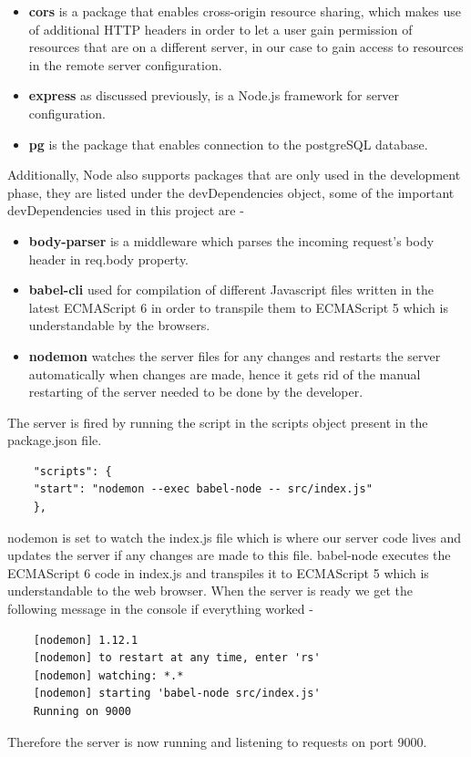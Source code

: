 \documentclass[../thesis.tex]{subfiles}
\begin{document}
	\begin{itemize}
		\item \textbf{cors} is a package that enables cross-origin resource sharing, which makes use of additional HTTP headers in order to let a user gain permission of resources that are on a different server, in our case to gain access to resources in the remote server configuration.

		\item \textbf{express} as discussed previously, is a Node.js framework for server configuration.

		\item \textbf{pg} is the package that enables connection to the postgreSQL database.
	\end{itemize}

	Additionally, Node also supports packages that are only used in the development phase, they are listed under the devDependencies object, some of the important devDependencies used in this project are - 
	\bigskip
	\begin{itemize}
		\item \textbf{body-parser} is a middleware which parses the incoming request's body header in req.body property.

		\item \textbf{babel-cli} used for compilation of different Javascript files written in the latest ECMAScript 6 in order to transpile them to ECMAScript 5 which is understandable by the browsers.

		\item \textbf{nodemon} watches the server files for any changes and restarts the server automatically when changes are made, hence it gets rid of the manual restarting of the server needed to be done by the developer.
	\end{itemize}

	The server is fired by running the script in the scripts object present in the package.json file.
	\begin{verbatim}
	"scripts": {
	"start": "nodemon --exec babel-node -- src/index.js"
	},
	\end{verbatim}
	nodemon is set to watch the index.js file which is where our server code lives and updates the server if any changes are made to this file. babel-node executes the ECMAScript 6 code in index.js and transpiles it to ECMAScript 5 which is understandable to the web browser. When the server is ready we get the following message in the console if everything worked - 
	\begin{verbatim}
	[nodemon] 1.12.1
	[nodemon] to restart at any time, enter 'rs'
	[nodemon] watching: *.*
	[nodemon] starting 'babel-node src/index.js'
	Running on 9000
	\end{verbatim}
	Therefore the server is now running and listening to requests on port 9000.
	\newline
	
\end{document}
